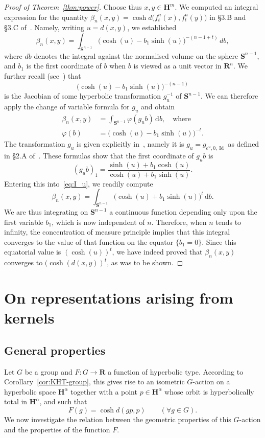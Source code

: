 \documentclass[11pt]{article}
\theoremstyle{definition}
\numberwithin{equation}{section}
\numberwithin{figure}{section}
\numberwithin{table}{section}
\newcommand{\RR}{\mathbf{R}}
\newcommand{\bS}{\mathbf{S}}
\newcommand{\HH}{\mathbf{H}}
\DeclareMathOperator{\Id}{Id}
\newcommand{\inv}{^{-1}}
\newcommand{\fhi}{\varphi}
\newcommand*{\dd}{\mathrm{d}}
\let\oldforall\forall
\renewcommand*{\forall}{\mathrel{\oldforall}}
\begin{document}
\begin{proof}[Proof of Theorem~\ref{thm:power}]
Choose thus $x,y\in \HH^m$. We computed an integral expression for the quantity $\beta_n(x,y)=\cosh d\big(f^n_t(x), f^n_t(y)\big)$ in \S3.B and \S3.C of~\cite{Monod-Py}. Namely, writing $u=d(x,y)$, we established
\[
\beta_n(x,y) =\int_{\bS^{n-1}}\big(\cosh(u)-b_{1}\sinh(u)\big)^{-(n-1+t)} \, db,
\]
where $db$ denotes the integral against the normalised volume on the sphere $\bS^{n-1}$, and $b_1$ is the first coordinate of $b$ when $b$ is viewed as a unit vector in $\RR^n$. We further recall (see~\cite[(3.vi)]{Monod-Py}) that
\[
\big(\cosh(u)-b_{1}\sinh(u) \big)^{-(n-1)}
\]
is the Jacobian of some hyperbolic transformation $g_u\inv$ of $\bS^{n-1}$. We can therefore apply the change of variable formula for $g_u$ and obtain
\begin{equation}\label{eq:I_u}
\begin{split}
\beta_n(x,y) &=\int_{\bS^{n-1}} \fhi(g_u b) \, \dd b, \quad\text{where} \\
\fhi(b) &=\big(\cosh(u)-b_{1}\sinh(u) \big)^{-t}.
\end{split}
\end{equation}
The transformation $g_u$ is given explicitly in~\cite{Monod-Py}, namely it is $g_{u}=g_{e^{u},0,\Id}$ as defined in \S2.A of~\cite{Monod-Py}. These formulas show that the first coordinate of $g_u b$ is
\[
(g_u b)_1 = \frac{\sinh(u)+ b_1 \cosh(u)}{\cosh(u) + b_1 \sinh(u) }.
\]
Entering this into~\eqref{eq:I_u}, we readily compute
\[
\beta_n(x,y) =\int_{\bS^{n-1}} \big(\cosh(u)+b_{1}\sinh(u) \big)^{t}\, \dd b.
\]
We are thus integrating on $\bS^{n-1}$ a continuous function depending only upon the first variable $b_1$, which is now independent of $n$. Therefore, when $n$ tends to infinity, the concentration of measure principle implies that this integral converges to the value of that function on the equator $\{b_1=0\}$. Since this equatorial value is $(\cosh(u))^t$, we have indeed proved that $\beta_n(x,y)$ converges to $(\cosh(d(x,y))^t$, as was to be shown.
\end{proof}


\section{On representations arising from kernels}

\subsection{General properties}

Let $G$ be a group and $F\colon G\to \RR$ a function of hyperbolic type. According to Corollary~\ref{cor:KHT-group}, this gives rise to an isometric $G$-action on a hyperbolic space $\HH^\alpha$ together with a point $p\in \HH^\alpha$ whose orbit is hyperbolically total in $\HH^\alpha$, and such that
\[
F(g) = \cosh d(gp, p) \qquad (\forall g\in G).
\]
We now investigate the relation between the geometric properties of this $G$-action and the properties of the function $F$.
\end{document}
